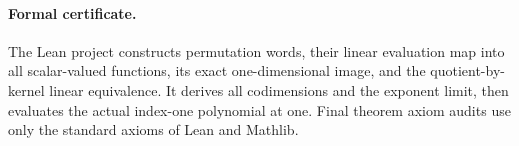 \documentclass[11pt]{article}
\begin{document}
\paragraph{Formal certificate.}
The Lean project constructs permutation words, their linear evaluation
map into all scalar-valued functions, its exact one-dimensional image,
and the quotient-by-kernel linear equivalence. It derives all
codimensions and the exponent limit, then evaluates the actual
index-one polynomial at one. Final theorem axiom audits use only the
standard axioms of Lean and Mathlib.
\end{document}
